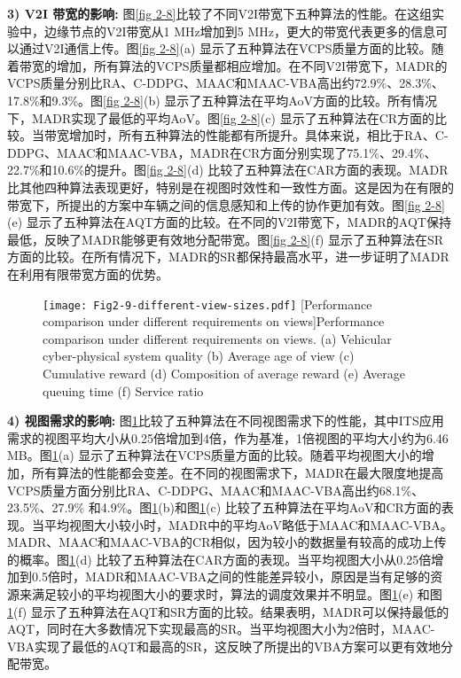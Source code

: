 \textbf{3) V2I 带宽的影响:}
图\ref{fig 2-8}比较了不同V2I带宽下五种算法的性能。在这组实验中，边缘节点的V2I带宽从1 MHz增加到5 MHz，更大的带宽代表更多的信息可以通过V2I通信上传。图\ref{fig 2-8}(a) 显示了五种算法在VCPS质量方面的比较。随着带宽的增加，所有算法的VCPS质量都相应增加。在不同V2I带宽下，MADR的VCPS质量分别比RA、C-DDPG、MAAC和MAAC-VBA高出约72.9\%、28.3\%、17.8\%和9.3\%。图\ref{fig 2-8}(b) 显示了五种算法在平均AoV方面的比较。所有情况下，MADR实现了最低的平均AoV。图\ref{fig 2-8}(c) 显示了五种算法在CR方面的比较。当带宽增加时，所有五种算法的性能都有所提升。具体来说，相比于RA、C-DDPG、MAAC和MAAC-VBA，MADR在CR方面分别实现了75.1\%、29.4\%、22.7\%和10.6\%的提升。图\ref{fig 2-8}(d) 比较了五种算法在CAR方面的表现。MADR比其他四种算法表现更好，特别是在视图时效性和一致性方面。这是因为在有限的带宽下，所提出的方案中车辆之间的信息感知和上传的协作更加有效。图\ref{fig 2-8}(e) 显示了五种算法在AQT方面的比较。在不同的V2I带宽下，MADR的AQT保持最低，反映了MADR能够更有效地分配带宽。图\ref{fig 2-8}(f) 显示了五种算法在SR方面的比较。在所有情况下，MADR的SR都保持最高水平，进一步证明了MADR在利用有限带宽方面的优势。

\begin{figure}[h]
  \centering
  \texttt{[image: Fig2-9-different-view-sizes.pdf]}
  [Performance comparison under different requirements on views]{Performance comparison under different requirements on views. (a) Vehicular cyber-physical system quality (b) Average age of view (c) Cumulative reward (d) Composition of average reward (e) Average queuing time (f) Service ratio}
  \label{fig 2-9}
\end{figure}

\textbf{4) 视图需求的影响:}
图\ref{fig 2-9}比较了五种算法在不同视图需求下的性能，其中ITS应用需求的视图平均大小从0.25倍增加到4倍，作为基准，1倍视图的平均大小约为6.46 MB。图\ref{fig 2-9}(a) 显示了五种算法在VCPS质量方面的比较。随着平均视图大小的增加，所有算法的性能都会变差。在不同的视图需求下，MADR在最大限度地提高VCPS质量方面分别比RA、C-DDPG、MAAC和MAAC-VBA高出约68.1\%、23.5\%、27.9\% 和4.9\%。图\ref{fig 2-9}(b)和图\ref{fig 2-9}(c) 比较了五种算法在平均AoV和CR方面的表现。当平均视图大小较小时，MADR中的平均AoV略低于MAAC和MAAC-VBA。MADR、MAAC和MAAC-VBA的CR相似，因为较小的数据量有较高的成功上传的概率。图\ref{fig 2-9}(d) 比较了五种算法在CAR方面的表现。当平均视图大小从0.25倍增加到0.5倍时，MADR和MAAC-VBA之间的性能差异较小，原因是当有足够的资源来满足较小的平均视图大小的要求时，算法的调度效果并不明显。图\ref{fig 2-9}(e) 和图\ref{fig 2-9}(f) 显示了五种算法在AQT和SR方面的比较。结果表明，MADR可以保持最低的AQT，同时在大多数情况下实现最高的SR。当平均视图大小为2倍时，MAAC-VBA实现了最低的AQT和最高的SR，这反映了所提出的VBA方案可以更有效地分配带宽。

